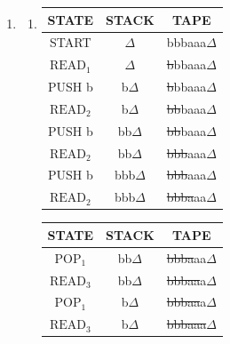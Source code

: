 \begin{solution}
    \begin{enumerate}[label=\alph*)]
        \item \begin{enumerate}[label=\arabic*)]
            \item \begin{table}[H]
                \centering\begin{tabular}{|c|c|c|}
                    \hline
                    \textbf{STATE} & \textbf{STACK} & \textbf{TAPE} \\
                    \hline
                    START & $\Delta$ & bbbaaa$\Delta$\\
                    \hline
                    $\text{READ}_1$ & $\Delta$ & \sout{b}bbaaa$\Delta$\\
                    \hline
                    PUSH b & b$\Delta$ &\sout{b}bbaaa$\Delta$\\
                    \hline
                    $\text{READ}_2$ & b$\Delta$ & \sout{bb}baaa$\Delta$\\
                    \hline
                    PUSH b & bb$\Delta$ &\sout{bb}baaa$\Delta$\\
                    \hline
                    $\text{READ}_2$ & bb$\Delta$ & \sout{bbb}aaa$\Delta$\\
                    \hline
                    PUSH b & bbb$\Delta$ &\sout{bbb}aaa$\Delta$\\
                    \hline
                    $\text{READ}_2$ & bbb$\Delta$ & \sout{bbba}aa$\Delta$\\
                    \hline
                \end{tabular}
                \quad
                \begin{tabular}{|c|c|c|}
                    \hline
                    \textbf{STATE} & \textbf{STACK} & \textbf{TAPE} \\
                    \hline
                    $\text{POP}_1$ & bb$\Delta$ &\sout{bbba}aa$\Delta$\\
                    \hline
                    $\text{READ}_3$ & bb$\Delta$ & \sout{bbbaa}a$\Delta$\\
                    \hline
                    $\text{POP}_1$ & b$\Delta$ &\sout{bbbaa}a$\Delta$\\
                    \hline
                    $\text{READ}_3$ & b$\Delta$ & \sout{bbbaaa}$\Delta$\\
                    \hline

\end{tabular}
\end{table}
\end{enumerate}
\end{enumerate}
\end{solution}
